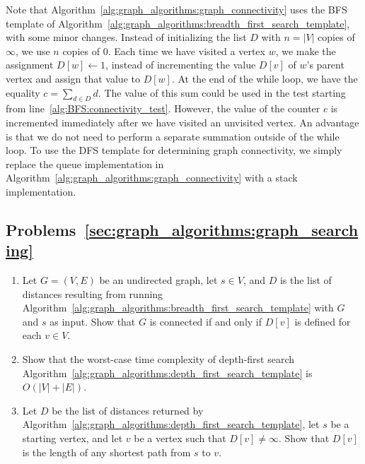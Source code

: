 Note that Algorithm~\ref{alg:graph_algorithms:graph_connectivity} uses
the BFS template of
Algorithm~\ref{alg:graph_algorithms:breadth_first_search_template},
with some minor changes. Instead of initializing the list $D$ with
$n = |V|$ copies of $\infty$, we use $n$ copies of $0$. Each time we
have visited a vertex $w$, we make the assignment $D[w] \leftarrow 1$,
instead of incrementing the value $D[v]$ of $w$'s parent vertex and
assign that value to $D[w]$. At the end of the while loop, we have the
equality $c = \sum_{d \in D} d$. The value of this sum could be used
in the test starting from line~\ref{alg:BFS:connectivity_test}.
However, the value of the counter $c$ is incremented immediately after
we have visited an unvisited vertex. An advantage is that we do not
need to perform a separate summation outside of the while loop. To use
the DFS template for determining graph connectivity, we simply replace
the queue implementation in
Algorithm~\ref{alg:graph_algorithms:graph_connectivity} with a stack
implementation.



\subsection*{Problems~\ref{sec:graph_algorithms:graph_searching}}

\begin{enumerate}
\item Let $G = (V, E)$ be an undirected graph, let $s \in V$, and $D$
  is the list of distances resulting from running
  Algorithm~\ref{alg:graph_algorithms:breadth_first_search_template}
  with $G$ and $s$ as input. Show that $G$ is connected if and only if
  $D[v]$ is defined for each $v \in V$.

\item Show that the worst-case time complexity of depth-first search
  Algorithm~\ref{alg:graph_algorithms:depth_first_search_template} is
  $O(|V| + |E|)$.

\item Let $D$ be the list of distances returned by
  Algorithm~\ref{alg:graph_algorithms:depth_first_search_template},
  let $s$ be a starting vertex, and let $v$ be a vertex such that
  $D[v] \neq \infty$. Show that $D[v]$ is the length of any shortest
  path from $s$ to $v$.
\end{enumerate}




